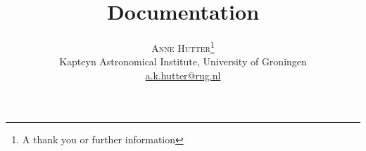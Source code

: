 \documentclass[twoside,10pt]{article}
\title{\vspace{-15mm}\fontsize{24pt}{10pt}\selectfont\textbf{\sc Documentation}} %
\author{
\large
\textsc{Anne Hutter}\thanks{A thank you or further information}\\[2mm] %
\normalsize Kapteyn Astronomical Institute, University of Groningen \\ %
\normalsize \href{mailto:a.k.hutter@rug.nl}{a.k.hutter@rug.nl} %
\vspace{-5mm}
}
\date{}
\begin{document}
\maketitle %

\thispagestyle{fancy} %


\begin{abstract}

\noindent

\end{abstract}

\end{document}
